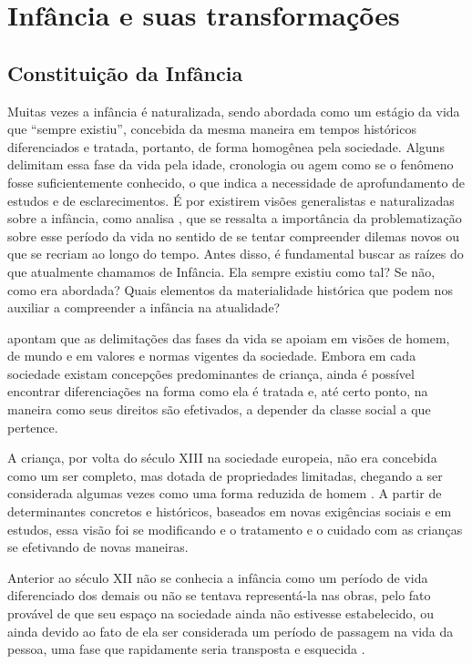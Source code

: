 
\chapter{Infância e suas transformações}

\section{Constituição da Infância}

Muitas vezes a infância é naturalizada, sendo abordada como um estágio da vida que ``sempre existiu'', concebida da mesma maneira em tempos históricos diferenciados e tratada, portanto, de forma homogênea pela sociedade. Alguns delimitam essa fase da vida pela idade, cronologia ou agem como se o fenômeno fosse suficientemente conhecido, o que indica a necessidade de aprofundamento de estudos e de esclarecimentos. É por existirem visões generalistas e naturalizadas sobre a infância, como analisa , que se ressalta a importância da problematização sobre esse período da vida no sentido de se tentar compreender dilemas novos ou que se recriam ao longo do tempo. Antes disso, é fundamental buscar as raízes do que atualmente chamamos de Infância. Ela sempre existiu como tal? Se não, como era abordada? Quais elementos da materialidade histórica que podem nos auxiliar a compreender a infância na atualidade?

 apontam que as delimitações das fases da vida se apoiam em visões de homem, de mundo e em valores e normas vigentes da sociedade. Embora em cada sociedade existam concepções predominantes de criança, ainda é possível encontrar diferenciações na forma como ela é tratada e, até certo ponto, na maneira como seus direitos são efetivados, a depender da classe social a que pertence.

A criança, por volta do século XIII na sociedade europeia, não era concebida como um ser completo, mas dotada de propriedades limitadas, chegando a ser considerada algumas vezes como uma forma reduzida de homem \cite{ARIES2011}. A partir de determinantes concretos e históricos, baseados em novas exigências sociais e em estudos, essa visão foi se modificando e o tratamento e o cuidado com as crianças se efetivando de novas maneiras. 

Anterior ao século XII não se conhecia a infância como um período de vida diferenciado dos demais ou não se tentava representá-la nas obras, pelo fato provável de que seu espaço na sociedade ainda não estivesse estabelecido\footnotemark, ou ainda devido ao fato de ela ser considerada um período de passagem na vida da pessoa, uma fase que rapidamente seria transposta e esquecida \cite{ARIES2011}.

